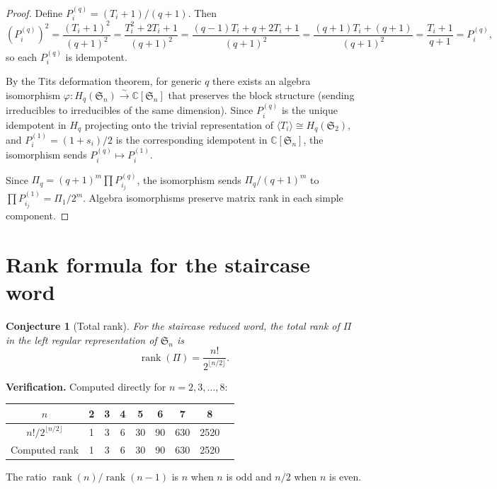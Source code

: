 \documentclass[11pt]{article}
\newtheorem{conjecture}[theorem]{Conjecture}
\theoremstyle{definition}
\theoremstyle{remark}
\newcommand{\CC}{\mathbb{C}}
\newcommand{\Sym}{\mathfrak{S}}
\begin{document}
\begin{proof}
Define $P_i^{(q)} = (T_i + 1)/(q + 1)$. Then
\[
  (P_i^{(q)})^2 = \frac{(T_i + 1)^2}{(q+1)^2}
  = \frac{T_i^2 + 2T_i + 1}{(q+1)^2}
  = \frac{(q-1)T_i + q + 2T_i + 1}{(q+1)^2}
  = \frac{(q+1)T_i + (q+1)}{(q+1)^2}
  = \frac{T_i + 1}{q+1} = P_i^{(q)},
\]
so each $P_i^{(q)}$ is idempotent.

By the Tits deformation theorem, for generic $q$ there exists an algebra
isomorphism $\varphi: H_q(\Sym_n) \xrightarrow{\sim} \CC[\Sym_n]$ that
preserves the block structure (sending irreducibles to irreducibles of the
same dimension). Since $P_i^{(q)}$ is the unique idempotent in $H_q$ projecting
onto the trivial representation of $\langle T_i \rangle \cong H_q(\Sym_2)$,
and $P_i^{(1)} = (1+s_i)/2$ is the corresponding idempotent in $\CC[\Sym_n]$,
the isomorphism sends $P_i^{(q)} \mapsto P_i^{(1)}$.

Since $\Pi_q = (q+1)^m \prod P_{i_j}^{(q)}$, the isomorphism sends
$\Pi_q/(q+1)^m$ to $\prod P_{i_j}^{(1)} = \Pi_1/2^m$.
Algebra isomorphisms preserve matrix rank in each simple component.
\end{proof}


\section{Rank formula for the staircase word}

\begin{conjecture}[Total rank]
\label{conj:total}
For the staircase reduced word, the total rank of $\Pi$ in the left regular
representation of $\Sym_n$ is
\[
  \operatorname{rank}(\Pi) = \frac{n!}{2^{\lfloor n/2 \rfloor}}.
\]
\end{conjecture}

\noindent\textbf{Verification.} Computed directly for $n = 2, 3, \dots, 8$:

\begin{center}
\begin{tabular}{c|cccccccc}
$n$ & 2 & 3 & 4 & 5 & 6 & 7 & 8 \\
\hline
$n!/2^{\lfloor n/2 \rfloor}$ & 1 & 3 & 6 & 30 & 90 & 630 & 2520 \\
Computed rank & 1 & 3 & 6 & 30 & 90 & 630 & 2520
\end{tabular}
\end{center}

The ratio $\operatorname{rank}(n)/\operatorname{rank}(n-1)$ is $n$ when $n$ is
odd and $n/2$ when $n$ is even.
\end{document}
